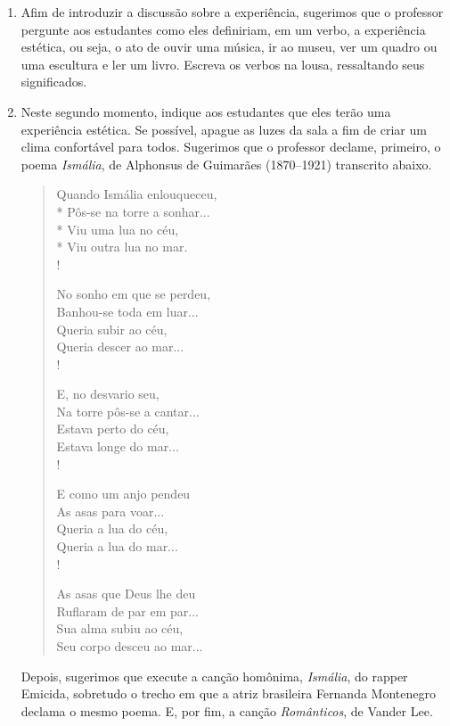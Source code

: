 \documentclass[12pt]{extarticle}
\begin{document}
\begin{enumerate}

  \item
  Afim de introduzir a discussão sobre a experiência, sugerimos
  que o professor pergunte aos estudantes como eles definiriam,
  em um verbo, a experiência estética, ou seja, o ato de ouvir uma 
  música, ir ao museu, ver um quadro ou uma escultura e ler um livro.
  Escreva os verbos na lousa, ressaltando seus significados.

  \item Neste segundo momento, indique aos estudantes que eles 
  terão uma experiência estética. Se possível, apague as luzes da
  sala a fim de criar um clima confortável para todos. Sugerimos
  que o professor declame, primeiro, o poema \textit{Ismália}, de 
  Alphonsus de Guimarães (1870--1921) transcrito abaixo.

\begin{verse}
Quando Ismália enlouqueceu,\\*
Pôs-se na torre a sonhar...\\*
Viu uma lua no céu,\\*
Viu outra lua no mar.\\!


No sonho em que se perdeu,\\
Banhou-se toda em luar...\\
Queria subir ao céu,\\
Queria descer ao mar...\\!


E, no desvario seu,\\
Na torre pôs-se a cantar...\\
Estava perto do céu,\\
Estava longe do mar...\\!


E como um anjo pendeu\\
As asas para voar...\\
Queria a lua do céu,\\
Queria a lua do mar...\\!


As asas que Deus lhe deu\\
Ruflaram de par em par...\\
Sua alma subiu ao céu,\\
Seu corpo desceu ao mar...
\end{verse}

  Depois, sugerimos que execute a canção homônima, \textit{Ismália}, do rapper Emicida,
  sobretudo o trecho em que a atriz brasileira Fernanda Montenegro declama
  o mesmo poema. E, por fim, a canção \textit{Românticos}, de Vander Lee.


\end{enumerate}
\end{document}
